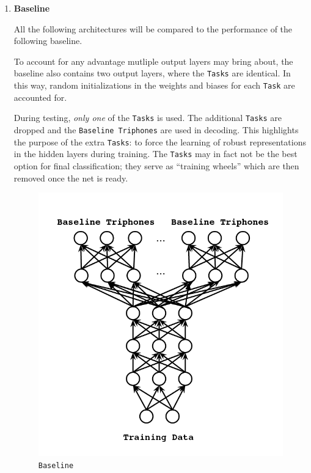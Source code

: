 \documentclass[10pt,a4paper]{article}
\begin{document}
\begin{enumerate}

\item \textbf{Baseline}

All the following architectures will be compared to the performance of the following baseline.

To account for any advantage mutliple output layers may bring about, the baseline also contains two output layers, where the \texttt{Tasks} are identical. In this way, random initializations in the weights and biases for each \texttt{Task} are accounted for.

During testing, \textit{only one} of the \texttt{Tasks} is used. The additional \texttt{Tasks} are dropped and the \texttt{Baseline Triphones} are used in decoding. This highlights the purpose of the extra \texttt{Tasks}: to force the learning of robust representations in the hidden layers during training. The \texttt{Tasks} may in fact not be the best option for final classification; they serve as ``training wheels'' which are then removed once the net is ready. 

\begin{figure}[!htb]
  \centering
{}
  \includegraphics[width=\linewidth]{figs/mtl-arch-baseline.png}
  \caption{\texttt{Baseline}}
\endminipage\hfill
\end{figure}




\end{enumerate}
\end{document}
